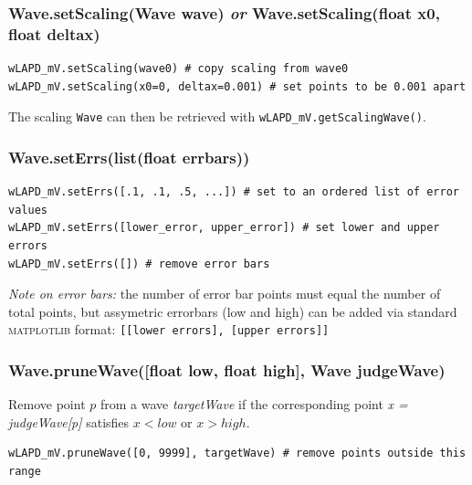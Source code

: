 \documentclass[10pt]{report}
\begin{document}
\clearpage
\subsubsection*{Wave.\textbf{setScaling}({\color{args}Wave \textbf{wave}}) \textit{or} Wave.\textbf{setScaling}({\color{args}float \textbf{x0}, float \textbf{deltax}})}
\begin{lstlisting}[caption=Reset scaling information after Wave creation]
wLAPD_mV.setScaling(wave0) # copy scaling from wave0
wLAPD_mV.setScaling(x0=0, deltax=0.001) # set points to be 0.001 apart
\end{lstlisting}

The scaling \texttt{Wave} can then be retrieved with \texttt{wLAPD\_mV.getScalingWave()}.

\subsubsection*{Wave.\textbf{setErrs}({\color{args}list(float \textbf{errbars}}))}
\begin{lstlisting}[caption=Set error bars or remove them]
wLAPD_mV.setErrs([.1, .1, .5, ...]) # set to an ordered list of error values
wLAPD_mV.setErrs([lower_error, upper_error]) # set lower and upper errors
wLAPD_mV.setErrs([]) # remove error bars
\end{lstlisting}
\textit{Note on error bars:} the number of error bar points must equal the number of total points, but assymetric errorbars (low and high) can be added via standard \textsc{matplotlib} format: \texttt{[[lower errors], [upper errors]]}


\subsubsection*{Wave.\textbf{pruneWave}({\color{args}[float \textbf{low}, float \textbf{high}], Wave \textbf{judgeWave}})}
Remove point $p$ from a wave \textit{targetWave} if the corresponding point \textit{x = judgeWave[p]} satisfies $x < low$ or $x > high$.
\begin{lstlisting}[caption=pruneWave format]
wLAPD_mV.pruneWave([0, 9999], targetWave) # remove points outside this range
\end{lstlisting}



\clearpage
\end{document}
